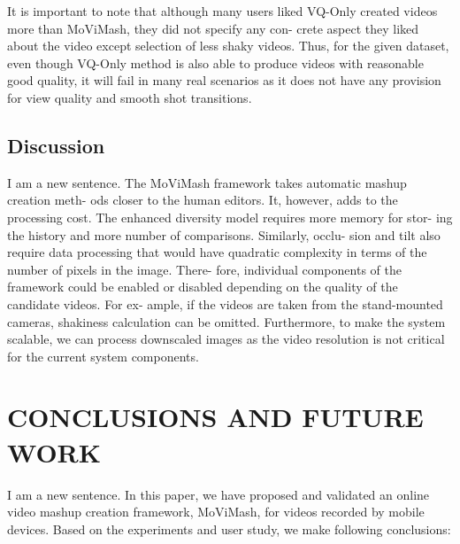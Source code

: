 \documentclass{sig-alternate}
\begin{document}
It is important to note that although many users liked VQ-Only
created videos more than MoViMash, they did not specify any con-
crete aspect they liked about the video except selection of less
shaky videos. Thus, for the given dataset, even though VQ-Only
method is also able to produce videos with reasonable good quality,
it will fail in many real scenarios as it does not have any provision
for view quality and smooth shot transitions.

\subsection{Discussion}
I am a new sentence.
The MoViMash framework takes automatic mashup creation meth-
ods closer to the human editors. It, however, adds to the processing
cost. The enhanced diversity model requires more memory for stor-
ing the history and more number of comparisons. Similarly, occlu-
sion and tilt also require data processing that would have quadratic
complexity in terms of the number of pixels in the image. There-
fore, individual components of the framework could be enabled or
disabled depending on the quality of the candidate videos. For ex-
ample, if the videos are taken from the stand-mounted cameras,
shakiness calculation can be omitted. Furthermore, to make the
system scalable, we can process downscaled images as the video
resolution is not critical for the current system components.

\section{CONCLUSIONS AND FUTURE WORK}
I am a new sentence.
In this paper, we have proposed and validated an online video
mashup creation framework, MoViMash, for videos recorded by
mobile devices. Based on the experiments and user study, we make
following conclusions:
\end{document}
